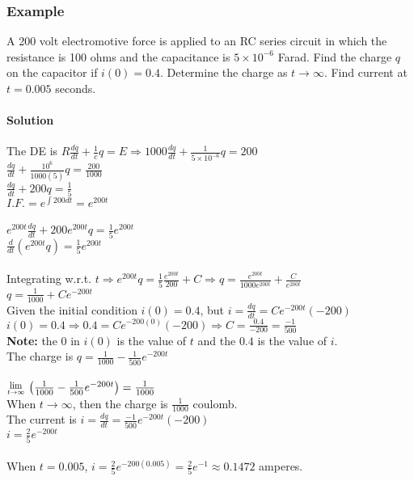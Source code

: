 \documentclass{article}
\newcommand{\Lim}[1]{\raisebox{0.5ex}{\scalebox{0.8}{$\displaystyle \lim_{#1}\;$}}}
\begin{document}
\subsubsection{Example}
A 200 volt electromotive force is applied to an RC series circuit in which the resistance is 100 ohms and the capacitance is $5\times 10^{-6}$ Farad.
Find the charge $q$ on the capacitor if $i(0)=0.4$. Determine the charge as $t\to\infty$. Find current at $t=0.005$ seconds.

\newpage\paragraph{Solution}
The DE is $R\frac{dq}{dt}+\frac{1}{c}q=E\Rightarrow 1000\frac{dq}{dt}+\frac{1}{5\times10^{-6}}q=200$
\\$\frac{dq}{dt}+\frac{10^6}{1000(5)}q=\frac{200}{1000}$
\\$\frac{dq}{dt}+200q=\frac{1}{5}$
\\$I.F.=e^{\int200dt}=e^{200t}$
\\\\$e^{200t}\frac{dq}{dt}+200e^{200t}q=\frac{1}{5}e^{200t}$
\\$\frac{d}{dt}(e^{200t}q)=\frac{1}{5}e^{200t}$
\\\\Integrating w.r.t. $t\Rightarrow e^{200t}q=\frac{1}{5}\frac{e^{200t}}{200}+C\Rightarrow q=\frac{e^{200t}}{1000e^{200t}}+\frac{C}{e^{200t}}$
\\$q=\frac{1}{1000}+Ce^{-200t}$
\\Given the initial condition $i(0)=0.4$, but $i=\frac{dq}{dt}=Ce^{-200t}(-200)$
\\$i(0)=0.4\Rightarrow0.4=Ce^{-200(0)}(-200)\Rightarrow C=\frac{0.4}{-200}=\frac{-1}{500}$
\\\textbf{Note:} the $0$ in $i(0)$ is the value of $t$ and the $0.4$ is the value of $i$.
\\The charge is $q=\frac{1}{1000}-\frac{1}{500}e^{-200t}$
\\\\$\Lim{t\to\infty}\left(\frac{1}{1000}-\frac{1}{500}e^{-200t}\right)=\frac{1}{1000}$
\\When $t\to\infty$, then the charge is $\frac{1}{1000}$ coulomb.
\\The current is $i=\frac{dq}{dt}=\frac{-1}{500}e^{-200t}(-200)$
\\$i=\frac{2}{5}e^{-200t}$
\\\\When $t=0.005$, $i=\frac{2}{5}e^{-200(0.005)}=\frac{2}{5}e^{-1}\approx0.1472$ amperes.
\end{document}
